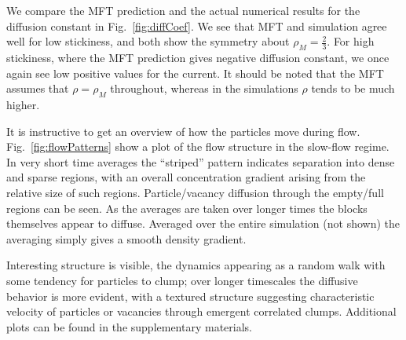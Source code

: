 \documentclass[
reprint, amsmath,amssymb, aps,
]{revtex4-1}
\begin{document}
We compare the MFT prediction and the actual numerical results for the
diffusion constant in Fig.~\ref{fig:diffCoef}. We see that MFT and
simulation agree well for low stickiness, and both show the symmetry
about $\rho_M = \frac{2}{3}$. For high stickiness, where the MFT
prediction gives negative diffusion constant, we once again see low
positive values for the current.  It should be noted that the MFT
assumes that $\rho = \rho_M$ throughout, whereas in the simulations $\rho$ tends to be much higher.

It is instructive to get an overview of how the particles move during
flow. Fig.~\ref{fig:flowPatterns} show a plot of the flow structure in
the slow-flow regime.  In very short time averages the ``striped''
pattern indicates separation into dense and sparse regions, with an
overall concentration gradient arising from the relative size of such
regions.  Particle/vacancy diffusion through the empty/full regions
can be seen.  As the averages are taken over longer times the blocks themselves appear to diffuse.  Averaged over the entire simulation (not shown) the averaging simply gives a smooth density gradient.


Interesting structure is visible, the dynamics appearing as a random walk with
some tendency for particles to clump; over longer timescales the
diffusive behavior is more evident, with a textured structure
suggesting characteristic velocity of particles or vacancies through
emergent correlated clumps.  Additional plots can be found in the
supplementary materials.
\end{document}
